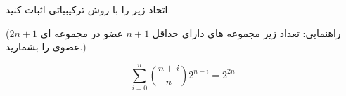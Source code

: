 \exercise
اتحاد زیر را با روش ترکیبیاتی اثبات کنید.

(راهنمایی: تعداد زیر مجموعه های دارای حداقل
$n + 1$
عضو در مجموعه ای
$2n + 1$
عضوی را بشمارید.)

$$\sum_{i=0}^{n}\binom{n+i}{n} 2^{n-i} = 2^{2n}$$